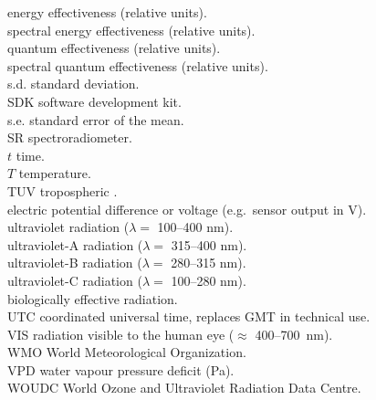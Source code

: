 \begin{tabbing}
\eeff   \> energy effectiveness (relative units).\\
\seeff  \> spectral energy effectiveness (relative units).\\
\qeff   \> quantum effectiveness (relative units).\\
\sqeff  \> spectral quantum effectiveness (relative units).\\
s.d. \> standard deviation.\\
SDK \> software development kit.\\
s.e. \> standard error of the mean.\\
SR \> spectroradiometer.\\
$t$ \> time.\\
$T$ \> temperature.\\
TUV \> tropospheric \UV.\\
\voltage  \> electric potential difference or voltage (e.g.\ sensor output in V).\\
\UV \> ultraviolet radiation ($\lambda =$ 100--400 nm).\\
\UVA \> ultraviolet-A radiation ($\lambda =$ 315--400 nm).\\
\UVB \> ultraviolet-B radiation ($\lambda =$ 280--315 nm).\\
\UVC \> ultraviolet-C radiation ($\lambda =$ 100--280 nm). \\
\UVeff \> biologically effective \UV radiation.\\
UTC \> coordinated universal time, replaces GMT in technical use.\\
VIS \> radiation visible to the human eye ($\approx$ 400--700~nm).\\
WMO \> World Meteorological Organization.\\
VPD \> water vapour pressure deficit (Pa).\\
WOUDC \> World Ozone and Ultraviolet Radiation Data Centre.\\
\end{tabbing}
